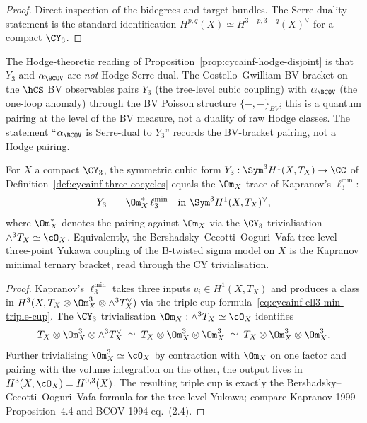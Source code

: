 \begin{proof}
Direct inspection of the bidegrees and target bundles. The Serre-duality
statement is the standard identification $H^{p,q}(X) \simeq
H^{3-p, 3-q}(X)^\vee$ for a compact $\CY_3$.
\end{proof}

\begin{remark}
\label{rem:cycainf-y3-alphabcov-bv-dual}
The Hodge-theoretic reading of Proposition~\ref{prop:cycainf-hodge-disjoint}
is that $Y_3$ and $\alpha_{\BCOV}$ are \emph{not} Hodge-Serre-dual.
The Costello--Gwilliam BV bracket on the $\hCS$ BV observables pairs
$Y_3$ (the tree-level cubic coupling) with $\alpha_{\BCOV}$ (the one-loop
anomaly) through the BV Poisson structure $\{-,-\}_{BV}$; this is a
quantum pairing at the level of the BV measure, not a duality of raw
Hodge classes. The statement ``$\alpha_{\BCOV}$ is Serre-dual to $Y_3$''
records the BV-bracket pairing, not a Hodge pairing.
\end{remark}

\begin{proposition}
\label{prop:cycainf-y3-equals-omega-trace-ell3-min}
For $X$ a compact $\CY_3$, the symmetric cubic form $Y_3: \Sym^3 H^1(X,
T_X) \to \CC$ of Definition~\ref{def:cycainf-three-cocycles} equals
the $\Om_X$-trace of Kapranov's $\ell_3^{\min}$:
\[
 Y_3 \;=\; \Om_X^* \, \ell_3^{\min}
 \quad \text{in } \Sym^3 H^1(X, T_X)^\vee,
\]
where $\Om_X^*$ denotes the pairing against $\Om_X$ via the
$\CY_3$ trivialisation $\wedge^3 T_X \simeq \cO_X$. Equivalently, the
Bershadsky--Cecotti--Ooguri--Vafa tree-level three-point Yukawa
coupling of the B-twisted sigma model on $X$ is the Kapranov minimal
ternary bracket, read through the CY trivialisation.
\end{proposition}

\begin{proof}
Kapranov's $\ell_3^{\min}$ takes three inputs $v_i \in H^1(X, T_X)$ and
produces a class in $H^3(X, T_X \otimes \Om^3_X \otimes \wedge^3 T_X^\vee)$
via the triple-cup formula~\eqref{eq:cycainf-ell3-min-triple-cup}. The
$\CY_3$ trivialisation $\Om_X: \wedge^3 T_X \simeq \cO_X$ identifies
\[
 T_X \otimes \Om^3_X \otimes \wedge^3 T_X^\vee \;\simeq\;
 T_X \otimes \Om^3_X \otimes \Om^3_X \;\simeq\; T_X \otimes \Om^3_X
 \otimes \Om^3_X.
\]
Further trivialising $\Om^3_X \simeq \cO_X$ by contraction with $\Om_X$
on one factor and pairing with the volume integration on the other,
the output lives in $H^3(X, \cO_X) = H^{0,3}(X)$. The resulting triple
cup is exactly the Bershadsky--Cecotti--Ooguri--Vafa formula for the
tree-level Yukawa; compare Kapranov 1999 Proposition~4.4 and BCOV 1994
eq.~(2.4).
\end{proof}

